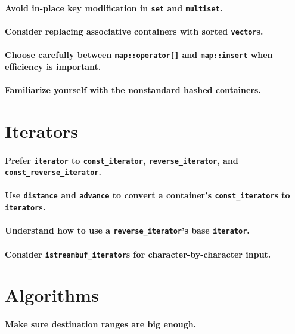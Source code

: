 \documentclass{article}
\begin{document}
\paragraph{Avoid in-place key modification in {\tt set} and {\tt multiset}.}
\paragraph{Consider replacing associative containers with sorted {\tt vector}s.}
\paragraph{Choose carefully between {\tt map::operator[]} and {\tt map::insert} when efficiency is important.}
\paragraph{Familiarize yourself with the nonstandard hashed containers.}

\section{Iterators}

\paragraph{Prefer {\tt iterator} to {\tt const\_iterator}, {\tt reverse\_iterator}, and {\tt const\_reverse\_iterator}.}
\paragraph{Use {\tt distance} and {\tt advance} to convert a container's {\tt const\_iterator}s to {\tt iterator}s.}
\paragraph{Understand how to use a {\tt reverse\_iterator}'s base {\tt iterator}.}
\paragraph{Consider {\tt istreambuf\_iterator}s for character-by-character input.}

\section{Algorithms}

\paragraph{Make sure destination ranges are big enough.}
\end{document}
